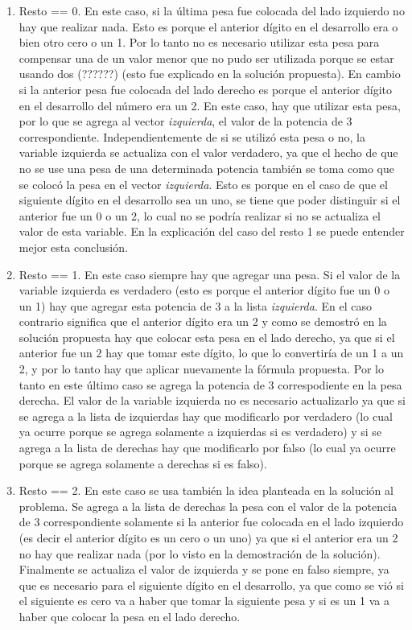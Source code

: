 	\begin{enumerate}
		\item{
			Resto == 0. En este caso, si la última pesa fue colocada del lado izquierdo no hay que realizar nada. Esto es porque el anterior dígito en el desarrollo era o bien otro cero o un 1. Por lo tanto no es necesario utilizar esta pesa para compensar una de un valor menor que no pudo ser utilizada porque se estar usando dos (??????) (esto fue explicado en la solución propuesta). En cambio si la anterior pesa fue colocada del lado derecho es porque el anterior dígito en el desarrollo del número era un 2. En este caso, hay que utilizar esta pesa, por lo que se agrega al vector \emph{izquierda}, el valor de la potencia de 3 correspondiente. Independientemente de si se utilizó esta pesa o no, la variable izquierda se actualiza con el valor verdadero, ya que el hecho de que no se use una pesa de una determinada potencia también se toma como que se colocó la pesa en el vector \emph{izquierda}. Esto es porque en el caso de que el siguiente dígito en el desarrollo sea un uno, se tiene que poder distinguir si el anterior fue un 0 o un 2, lo cual no se podría realizar si no se actualiza el valor de esta variable. En la explicación del caso del resto 1 se puede entender mejor esta conclusión. 
		}
		\item{
			Resto == 1. En este caso siempre hay que agregar una pesa. Si el valor de la variable izquierda es verdadero (esto es porque el anterior dígito fue un 0 o un 1) hay que agregar esta potencia de 3 a la lista \emph{ izquierda}. En el caso contrario significa que el anterior dígito era un 2 y como se demostró en la solución propuesta hay que colocar esta pesa en el lado derecho, ya que si el anterior fue un 2 hay que tomar este dígito, lo que lo convertiría de un 1 a un 2, y por lo tanto hay que aplicar nuevamente la fórmula propuesta. Por lo tanto en este último caso se agrega la potencia de 3 correspodiente en la pesa derecha. El valor de la variable izquierda no es necesario actualizarlo ya que si se agrega a la lista de izquierdas hay que modificarlo por verdadero (lo cual ya ocurre porque se agrega solamente a izquierdas si es verdadero) y si se agrega a la lista de derechas hay que modificarlo por falso (lo cual ya ocurre porque se agrega solamente a derechas si es falso).
		}
		\item{
			Resto == 2. En este caso se usa también la idea planteada en la solución al problema. Se agrega a la lista de derechas la pesa con el valor de la potencia de 3 correspondiente solamente si la anterior fue colocada en el lado izquierdo (es decir el anterior dígito es un cero o un uno) ya que si el anterior era un 2 no hay que realizar nada (por lo visto en la demostración de la solución). Finalmente se actualiza el valor de izquierda y se pone en falso siempre, ya que es necesario para el siguiente dígito en el desarrollo, ya que como se vió si el siguiente es cero va a haber que tomar la siguiente pesa y si es un 1 va a haber que colocar la pesa en el lado derecho.	
		}
	\end{enumerate}

